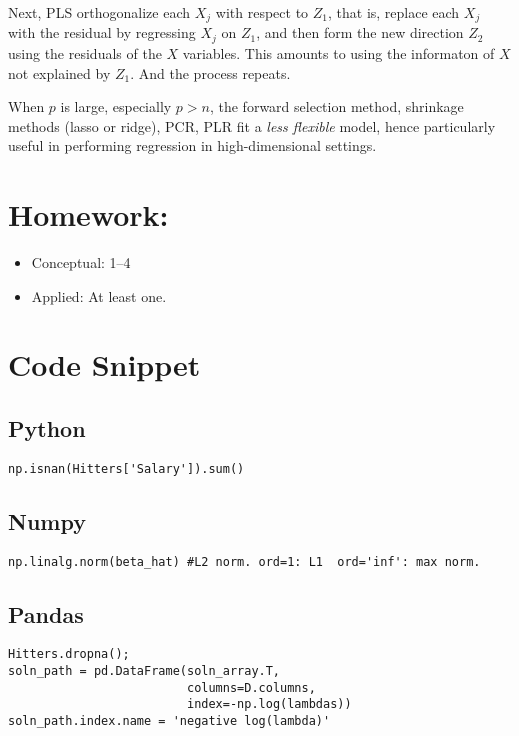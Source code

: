 \documentclass[
  letterpaper,
  DIV=11,
  numbers=noendperiod]{scrreprt}
\providecommand{\tightlist}{%
  \setlength{\itemsep}{0pt}\setlength{\parskip}{0pt}}\usepackage{longtable,booktabs,array}
\begin{document}
Next, PLS orthogonalize each \(X_j\) with respect to \(Z_1\), that is,
replace each \(X_j\) with the residual by regressing \(X_j\) on \(Z_1\),
and then form the new direction \(Z_2\) using the residuals of the \(X\)
variables. This amounts to using the informaton of \(X\) not explained
by \(Z_1\). And the process repeats.

When \(p\) is large, especially \(p>n\), the forward selection method,
shrinkage methods (lasso or ridge), PCR, PLR fit a \emph{less flexible}
model, hence particularly useful in performing regression in
high-dimensional settings.

\section{Homework:}\label{homework-2}

\begin{itemize}
\tightlist
\item
  Conceptual: 1--4
\item
  Applied: At least one.
\end{itemize}

\section{Code Snippet}\label{code-snippet}

\subsection{Python}\label{python-4}

\begin{verbatim}
np.isnan(Hitters['Salary']).sum()
\end{verbatim}

\subsection{Numpy}\label{numpy-4}

\begin{verbatim}
np.linalg.norm(beta_hat) #L2 norm. ord=1: L1  ord='inf': max norm.
\end{verbatim}

\subsection{Pandas}\label{pandas-4}

\begin{verbatim}
Hitters.dropna();
soln_path = pd.DataFrame(soln_array.T,
                         columns=D.columns,
                         index=-np.log(lambdas))
soln_path.index.name = 'negative log(lambda)'
\end{verbatim}
\end{document}
